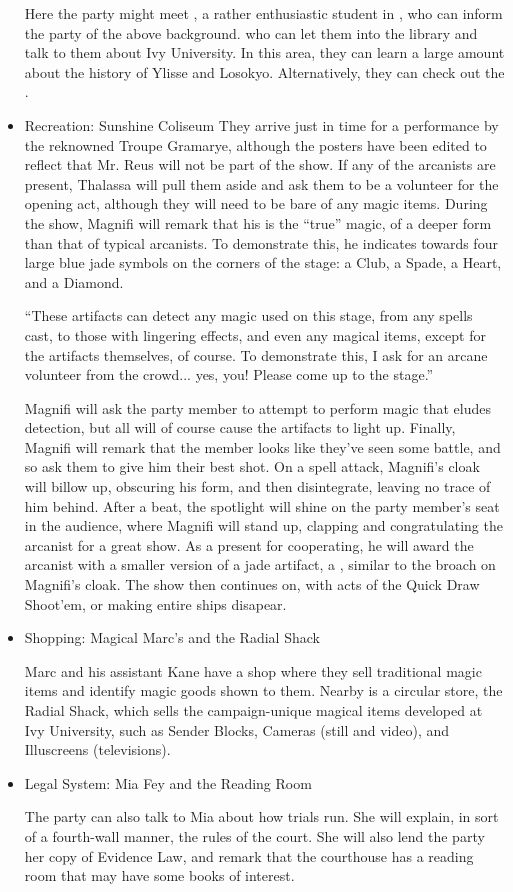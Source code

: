 \begin{itemize}
Here the party might meet , a rather enthusiastic student in , who can inform the party of the above background.  who can let them into the library and talk to them about Ivy University. In this area, they can learn a large amount about the history of Ylisse and Losokyo. Alternatively, they can check out the .
\item Recreation: Sunshine Coliseum
They arrive just in time for a performance by the reknowned Troupe Gramarye, although the posters have been edited to reflect that Mr. Reus will not be part of the show. If any of the arcanists are present, Thalassa will pull them aside and ask them to be a volunteer for the opening act, although they will need to be bare of any magic items. During the show, Magnifi will remark that his is the ``true'' magic, of a deeper form than that of typical arcanists. To demonstrate this, he indicates towards four large blue jade symbols on the corners of the stage: a Club, a Spade, a Heart, and a Diamond. 
\begin{center}
``These artifacts can detect any magic used on this stage, from any spells cast, to those with lingering effects, and even any magical items, except for the artifacts themselves, of course. To demonstrate this, I ask for an arcane volunteer from the crowd... yes, you! Please come up to the stage.''
\end{center}
Magnifi will ask the party member to attempt to perform magic that eludes detection, but all will of course cause the artifacts to light up. Finally, Magnifi will remark that the member looks like they've seen some battle, and so ask them to give him their best shot. On a spell attack, Magnifi's cloak will billow up, obscuring his form, and then disintegrate, leaving no trace of him behind. After a beat, the spotlight will shine on the party member's seat in the audience, where Magnifi will stand up, clapping and congratulating the arcanist for a great show. As a present for cooperating, he will award the arcanist with a smaller version of a jade artifact, a , similar to the broach on Magnifi's cloak. The show then continues on, with acts of the Quick Draw Shoot'em, or making entire ships disapear.

\item Shopping: Magical Marc's and the Radial Shack

Marc and his assistant Kane have a shop where they sell traditional magic items and identify magic goods shown to them. Nearby is a circular store, the Radial Shack, which sells the campaign-unique magical items developed at Ivy University, such as Sender Blocks, Cameras (still and video), and Illuscreens (televisions).

\item Legal System: Mia Fey and the Reading Room

The party can also talk to Mia about how trials run. She will explain, in sort of a fourth-wall manner, the rules of the court. She will also lend the party her copy of Evidence Law, and remark that the courthouse has a reading room that may have some books of interest.
\end{itemize}

